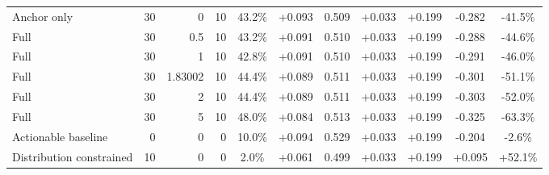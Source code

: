 \begin{table}[htbp]
\begin{tabular}{lrrrccccccc}
Anchor only & 30 & 0 & 10 & 43.2\% & +0.093 & 0.509 & +0.033 & +0.199 & -0.282 & -41.5\% \\
Full & 30 & 0.5 & 10 & 43.2\% & +0.091 & 0.510 & +0.033 & +0.199 & -0.288 & -44.6\% \\
Full & 30 & 1 & 10 & 42.8\% & +0.091 & 0.510 & +0.033 & +0.199 & -0.291 & -46.0\% \\
Full & 30 & 1.83002 & 10 & 44.4\% & +0.089 & 0.511 & +0.033 & +0.199 & -0.301 & -51.1\% \\
Full & 30 & 2 & 10 & 44.4\% & +0.089 & 0.511 & +0.033 & +0.199 & -0.303 & -52.0\% \\
Full & 30 & 5 & 10 & 48.0\% & +0.084 & 0.513 & +0.033 & +0.199 & -0.325 & -63.3\% \\
Actionable baseline & 0 & 0 & 0 & 10.0\% & +0.094 & 0.529 & +0.033 & +0.199 & -0.204 & -2.6\% \\
Distribution constrained & 10 & 0 & 0 & 2.0\% & +0.061 & 0.499 & +0.033 & +0.199 & +0.095 & +52.1\% \\
\bottomrule
\end{tabular}
\end{table}